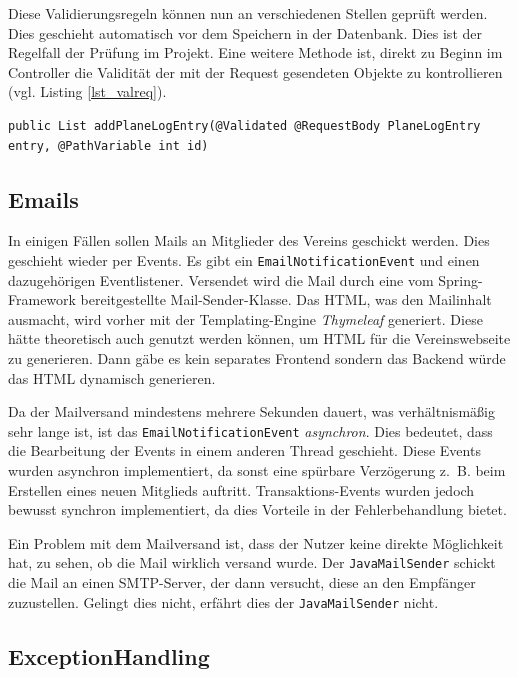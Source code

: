 \documentclass[a4paper, 11pt]{article}
\begin{document}
Diese Validierungsregeln können nun an verschiedenen Stellen geprüft werden.
Dies geschieht automatisch vor dem Speichern in der Datenbank. Dies ist der
Regelfall der Prüfung im Projekt. Eine weitere Methode ist, direkt zu Beginn im
Controller die Validität der mit der Request gesendeten Objekte zu kontrollieren (vgl. Listing \ref{lst_valreq}).

\begin{lstlisting}[caption=Beispiel für Validierung von Request-Parametern, label=lst_valreq]
public List addPlaneLogEntry(@Validated @RequestBody PlaneLogEntry entry, @PathVariable int id)
\end{lstlisting}

\subsection{Emails}

In einigen Fällen sollen Mails an Mitglieder des Vereins geschickt werden. Dies
geschieht wieder per Events. Es gibt ein \lstinline{EmailNotificationEvent} und
einen dazugehörigen Eventlistener. Versendet wird die Mail durch eine vom
Spring-Framework bereitgestellte Mail-Sender-Klasse. Das HTML, was den
Mailinhalt ausmacht, wird vorher mit der Templating-Engine \emph{Thymeleaf}
generiert. Diese hätte theoretisch auch genutzt werden können, um HTML für die
Vereinswebseite zu generieren. Dann gäbe es kein separates Frontend sondern das
Backend würde das HTML dynamisch generieren.

Da der Mailversand mindestens mehrere Sekunden dauert, was verhältnismäßig sehr
lange ist, ist das \lstinline{EmailNotificationEvent} \emph{asynchron}. Dies
bedeutet, dass die Bearbeitung der Events in einem anderen Thread geschieht.
Diese Events wurden asynchron implementiert, da sonst eine spürbare Verzögerung
z.~B. beim Erstellen eines neuen Mitglieds auftritt. Transaktions-Events wurden
jedoch bewusst synchron implementiert, da dies Vorteile in der Fehlerbehandlung
bietet.

Ein Problem mit dem Mailversand ist, dass der Nutzer keine direkte Möglichkeit
hat, zu sehen, ob die Mail wirklich versand wurde. Der
\lstinline{JavaMailSender} schickt die Mail an einen SMTP-Server, der dann
versucht, diese an den Empfänger zuzustellen. Gelingt dies nicht, erfährt dies
der \lstinline{JavaMailSender} nicht.

\subsection{ExceptionHandling}
\end{document}

